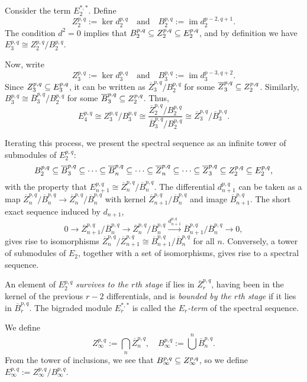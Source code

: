 \documentclass{MetricNotes2023}
\def\subq{\ensuremath\subseteq}
\DeclareMathOperator{\im}{im}
\begin{document}
Consider the term \(E_2^{*, *}\). Define 
\[Z_2^{p, q}:=\ker d_2^{p,q} \quad \text{and} \quad B_2^{p,q}:=\im d_2^{p-2,q+1}.\]
The condition \(d^2=0\) implies that \(B_2^{p,q}\subq Z_2^{p,q}\subq E_2^{p,q}\), and by definition we have \(E_3^{p,q}\cong Z^{p,q}_2/B_2^{p,q}\). 

Now, write 
\[Z_3^{p, q}:=\ker d_3^{p,q} \quad \text{and} \quad B_3^{p,q}:=\im d_3^{p-3,q+2}.\]
Since \(Z_3^{p,q}\subq E^{p,q}_3\), it can be written as \(\overline{Z}_3^{p,q}/B_2^{p,q}\) for some \(\overline{Z}_3^{p,q}\subq Z_2^{p,q}\). Similarly, \(B_3^{p,q}\cong \overline B_3^{p,q}/B_2^{p,q}\) for some \(\overline B_3^{p,q}\subq Z_2^{p,q}\). Thus,
\[E_4^{p,q}\cong Z_3^{p,q}/B_3^{p,q}\cong \frac{\overline Z_2^{p,q}/B_2^{p,q}}{\overline B_3^{p,q}/B_2^{p,q}}\cong \overline Z_3^{p,q}/\overline B_3^{p,q}.\]

Iterating this process, we present the spectral sequence as an infinite tower of submodules of \(E_2^{p,q}\):
\[B_2^{p,q}\subq \overline B_3^{p,q}\subq \cdots \subq \overline B_n^{p,q}\subq \cdots \subq \overline Z_n^{p,q}\subq \cdots \subq \overline Z_3^{p,q}\subq Z_2^{p,q}\subq E_2^{p,q},\]
with the property that \(E^{p,q}_{n+1}\cong \overline Z_n^{p,q}/\overline B_n^{p,q}\). The differential \(d_{n+1}^{p,q}\) can be taken as a map \(\overline Z^{p,q}_n/\overline B_n^{p,q}\to\overline Z_n^{p,q}/\overline B_n^{p,q}\) with kernel \(\overline Z_{n+1}^{p,q}/\overline B_n^{p,q}\) and image \(\overline B_{n+1}^{p,q}\). The short exact sequence induced by \(d_{n+1}\),
\[0 \to \overline Z^{p,q}_{n+1}/\overline B_n^{p,q}\to \overline Z_n^{p,q}/\overline B_n^{p,q} \xrightarrow{d_{n+1}^{p,q}} \overline B_{n+1}^{p,q}/\overline{B}_n^{p,q}\to 0,\]
gives rise to isomorphisms \(\overline{Z}_n^{p,q}/\overline{Z}_{n+1}^{p,q}\cong \overline{B}_{n+1}^{p,q}/\overline{B}_n ^{p,q}\) for all \(n\). Conversely, a tower of submodules of \(E_2\), together with a set of isomorphisms, gives rise to a spectral sequence. 

\begin{definition}
An element of \(E_2^{p,q}\) \textit{survives to the \(r\)th stage} if lies in \(\overline{Z}_r^{p,q}\), having been in the kernel of the previous \(r-2\) differentials, and is \textit{bounded by the \(r\)th stage} if it lies in \(\overline{B}_r^{p,q}\). The bigraded module \(E_r^{*,*}\) is called the \textit{\(E_r\)-term} of the spectral sequence. 
\end{definition}

We define 
\[Z_\infty^{p,q}:= \bigcap_n \overline{Z}^{p,q}_n, \quad B_\infty^{p,q}:=\bigcup^n \overline{B}^{p,q}_n.\]
From the tower of inclusions, we see that \(B_\infty^{p,q}\subq Z^{p,q}_\infty\), so we define \(E_\infty^{p,q}:=Z_\infty^{p,q}/B_\infty^{p,q}\). 
\end{document}
